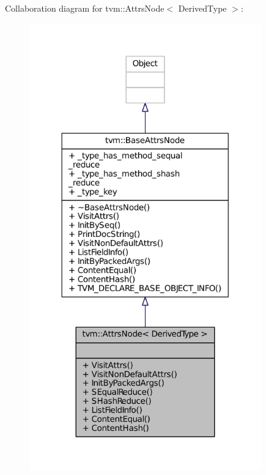 Collaboration diagram for tvm\+:\+:Attrs\+Node$<$ Derived\+Type $>$\+:
\nopagebreak
\begin{figure}[H]
\begin{center}
\leavevmode
\includegraphics[width=284pt]{classtvm_1_1AttrsNode__coll__graph}
\end{center}
\end{figure}
